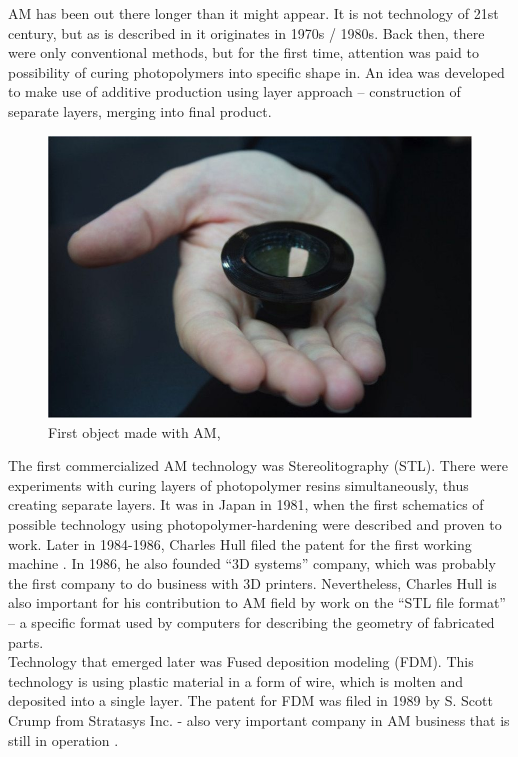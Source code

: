 \documentclass[a4paper, 11pt, reqno]{report}
\begin{document}
	AM has been out there longer than it might appear. It is not technology of 21st century, but as is described in \cite{AMOrigins} it originates in 1970s / 1980s. Back then, there were only conventional methods, but for the first time, attention was paid to possibility of curing photopolymers into specific shape in. An idea was developed to make use of additive production using layer approach – construction of separate layers, merging into final product.
\\
\begin{figure}
 	\includegraphics[width=\textwidth/2]{firstPrintedObject}
	\caption{First object made with AM, \cite{lastCitation}}
\end{figure}

	The first commercialized AM technology was Stereolitography (STL). There were experiments with curing layers of photopolymer resins simultaneously, thus creating separate layers. It was in Japan in 1981, when the first schematics of possible technology using photopolymer-hardening were described and proven to work. Later in 1984-1986, Charles Hull filed the patent for the first working machine \cite{FirstPatent}.
In 1986, he also founded “3D systems” company, which was probably the first company to do business with 3D printers. Nevertheless, Charles Hull is also important for his contribution to AM field by work on the “STL file format” – a specific format used by computers for describing the geometry of fabricated parts.\\
Technology that emerged later was Fused deposition modeling (FDM). This technology is using plastic material in a form of wire, which is molten and deposited into a single layer. The patent for FDM was filed in 1989 by S. Scott Crump from Stratasys Inc.  - also very important company in AM business that is still in operation \cite{CrumpPatent}.
\end{document}
